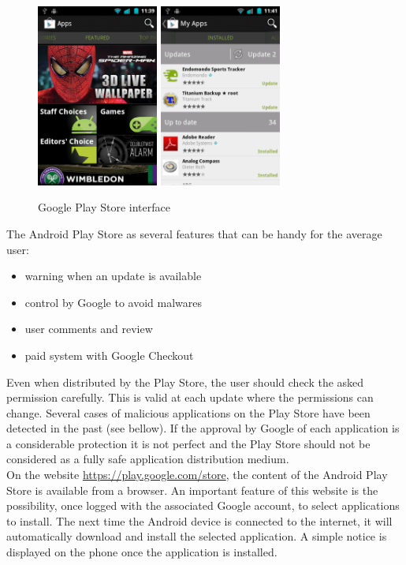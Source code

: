 \begin{figure}[h]
  \centering
  \includegraphics[width=4cm]{images/market1.png}
  \includegraphics[width=4cm]{images/market2.png}
  \caption{Google Play Store interface}
  \label{fig:market}
\end{figure}

The Android Play Store as several features that can be handy for the average user:
\begin{itemize}
\item warning when an update is available
\item control by Google to avoid malwares
\item user comments and review
\item paid system with Google Checkout
\end{itemize}

Even when distributed by the Play Store, the user should check the asked permission carefully.
This is valid at each update where the permissions can change.
Several cases of malicious applications on the Play Store have been detected in the past (see bellow).
If the approval by Google of each application is a considerable protection it is not perfect and the Play Store should not be considered as a fully safe application distribution medium.\\

On the website \url{https://play.google.com/store}, the content of the Android Play Store is available from a browser.
An important feature of this website is the possibility, once logged with the associated Google account, to select applications to install.
The next time the Android device is connected to the internet, it will automatically download and install the selected application.
A simple notice is displayed on the phone once the application is installed.\\

